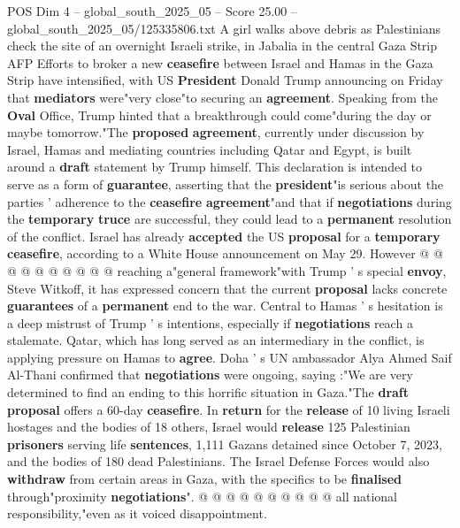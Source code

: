 \begin{textsample}{POS Dim 4 – global\_south\_2025\_05 – Score 25.00 – global\_south\_2025\_05/125335806.txt}  \label{ex:f4_pos_092}
A girl walks above debris as Palestinians check the site of an overnight Israeli strike, in Jabalia in the central Gaza Strip AFP Efforts to broker a new \textbf{ceasefire} between Israel and Hamas in the Gaza Strip have intensified, with US \textbf{President} Donald Trump announcing on Friday that \textbf{mediators} were"very close"to securing an \textbf{agreement}.
Speaking from the \textbf{Oval} Office, Trump hinted that a breakthrough could come"during the day or maybe tomorrow."The \textbf{proposed} \textbf{agreement}, currently under discussion by Israel, Hamas and mediating countries including Qatar and Egypt, is built around a \textbf{draft} statement by Trump himself.
This declaration is intended to serve as a form of \textbf{guarantee}, asserting that the \textbf{president}"is serious about the parties ' adherence to the \textbf{ceasefire} \textbf{agreement}"and that if \textbf{negotiations} during the \textbf{temporary} \textbf{truce} are successful, they could lead to a \textbf{permanent} resolution of the conflict.
Israel has already \textbf{accepted} the US \textbf{proposal} for a \textbf{temporary} \textbf{ceasefire}, according to a White House announcement on May 29.
However @ @ @ @ @ @ @ @ @ @ reaching a"general framework"with Trump ' s special \textbf{envoy}, Steve Witkoff, it has expressed concern that the current \textbf{proposal} lacks concrete \textbf{guarantees} of a \textbf{permanent} end to the war.
Central to Hamas ' s hesitation is a deep mistrust of Trump ' s intentions, especially if \textbf{negotiations} reach a stalemate.
Qatar, which has long served as an intermediary in the conflict, is applying pressure on Hamas to \textbf{agree}.
Doha ' s UN ambassador Alya Ahmed Saif Al-Thani confirmed that \textbf{negotiations} were ongoing, saying :"We are very determined to find an ending to this horrific situation in Gaza."The \textbf{draft} \textbf{proposal} offers a 60-day \textbf{ceasefire}.
In \textbf{return} for the \textbf{release} of 10 living Israeli hostages and the bodies of 18 others, Israel would \textbf{release} 125 Palestinian \textbf{prisoners} serving life \textbf{sentences}, 1,111 Gazans detained since October 7, 2023, and the bodies of 180 dead Palestinians.
The Israel Defense Forces would also \textbf{withdraw} from certain areas in Gaza, with the specifics to be \textbf{finalised} through"proximity \textbf{negotiations}". @ @ @ @ @ @ @ @ @ @ all national responsibility,"even as it voiced disappointment.

\end{textsample}
